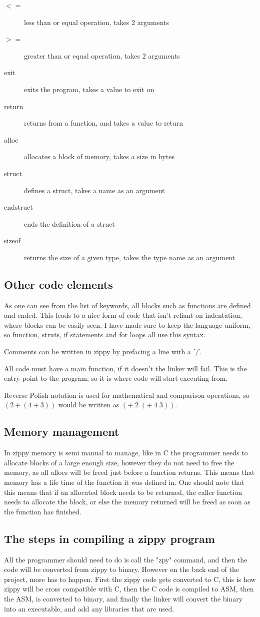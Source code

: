 \documentclass[a4paper,12pt]{article}
\begin{document}
{\begin{description}
	\item[\(<=\)] less than or equal operation, takes 2 arguments
	\item[\(>=\)] greater than or equal operation, takes 2 arguments
	\item[exit] exits the program, takes a value to exit on
	\item[return] returns from a function, and takes a value to return
	\item[alloc] allocates a block of memory, takes a size in bytes
	\item[struct] defines a struct, takes a name as an argument
	\item[endstruct] ends the definition of a struct
	\item[sizeof] returns the size of a given type, takes the type name as an argument
\end{description}  
\subsection{Other code elements}
As one can see from the list of keywords, all blocks such as functions are defined and ended. This leads to a nice
form of code that isn't reliant on indentation, where blocks can be easily seen. I have made sure to keep the 
language uniform, so function, struts, if statements and for loops all use this syntax.

Comments can be written in zippy by prefacing a line with a '/'.

All code must have a main function, if it doesn't the linker will fail. This is the entry point to the program, so
it is where code will start executing from.

Reverse Polish notation is used for mathematical and comparison operations, so \((2 + (4 + 3))\) would be written
as \((+\; 2\; (+\; 4\; 3))\). 
\subsection{Memory management}
In zippy memory is semi manual to manage, like in C the programmer needs to allocate blocks of a large enough size,
however they do not need to free the memory, as all allocs will be freed just before a function returns. This means 
that memory has a life time of the function it was defined in. One should note that this means that if an allocated 
block needs to be returned, the caller function needs to allocate the block, or else the memory returned will be 
freed as soon as the function has finished. 
\subsection{The steps in compiling a zippy program}
All the programmer should need to do is call the "zpy" command, and then the code will be converted from zippy to 
binary. However on the back end of the project, more has to happen. First the zippy code gets converted to C, this 
is how zippy will be cross compatible with C, then the C code is compiled to ASM, then the ASM, is converted to
binary, and finally the linker will convert the binary into an executable, and add any libraries that are used.

}
\end{document}
